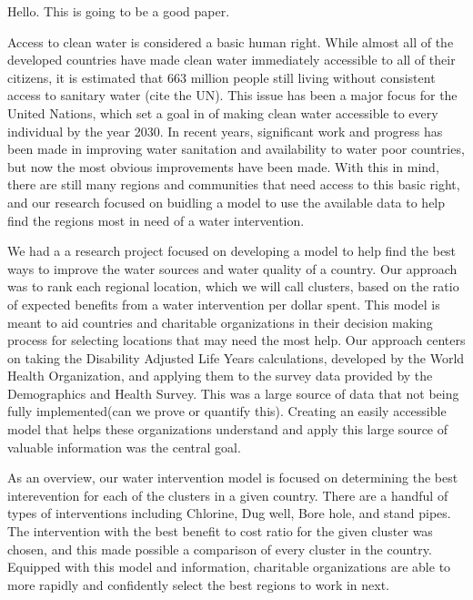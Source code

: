 Hello. This is going to be a good paper.

Access to clean water is considered a basic human right. While almost all of the developed countries have made clean water immediately accessible to all of their citizens, it is estimated that 663 million people still living without consistent access to sanitary water (cite the UN).
This issue has been a major focus for the United Nations, which set a goal in of making clean water accessible to every individual by the year 2030.
In recent years, significant work and progress has been made in improving water sanitation and availability to water poor countries, but now the most obvious improvements have been made.
With this in mind, there are still many regions and communities that need access to this basic right, and our research focused on buidling a model to use the available data to help find the regions most in need of a water intervention.  

We had a a research project focused on developing a model to help find the best ways to improve the water sources and water quality of a country.
Our approach was to rank each regional location, which we will call clusters, based on the ratio of expected benefits from a water intervention per dollar spent.
This model is meant to aid countries and charitable organizations in their decision making process for selecting locations that may need the most help.
Our approach centers on taking the Disability Adjusted Life Years calculations, developed by the World Health Organization, and applying them to the survey data provided by the Demographics and Health Survey.
This was a large source of data that not being fully implemented(can we prove or quantify this).
Creating an easily accessible model that helps these organizations understand and apply this large source of valuable information was the central goal.  
	
As an overview, our water intervention model is focused on determining the best interevention for each of the clusters in a given country.
There are a handful of types of interventions including Chlorine, Dug well, Bore hole, and stand pipes.
The intervention with the best benefit to cost ratio for the given cluster was chosen, and this made possible a comparison of every cluster in the country.
Equipped with this model and information, charitable organizations are able to more rapidly and confidently select the best regions to work in next.